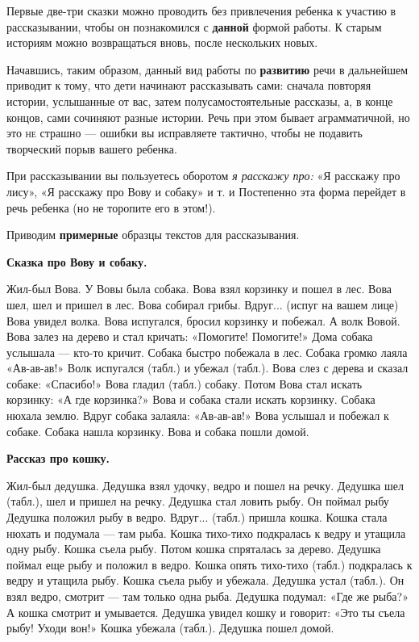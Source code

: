 \documentclass{book}
\renewcommand{\emph}[1]{\textit{#1}}
\begin{document}
Первые две-три сказки можно проводить без привлечения ребенка к участию
в рассказывании, чтобы он познакомился с \textbf{данной} формой работы.
К старым историям можно возвращаться вновь, после нескольких новых.

Начавшись, таким образом, данный вид работы по \textbf{развитию} речи в
дальнейшем приводит к тому, что дети начинают рассказывать сами: сначала
повторяя истории, услышанные от вас, затем полусамостоятельные рассказы,
а, в конце концов, сами сочиняют разные истории. Речь при этом бывает
аграмматичной, но это \textsc{не} страшно --- ошибки вы исправляете
тактично, чтобы не подавить творческий порыв вашего ребенка.

При рассказывании вы пользуетесь оборотом \emph{я расскажу про:} «Я
расскажу про лису», «Я расскажу про Вову и собаку» и т. и Постепенно эта
форма перейдет в речь ребенка (но не торопите его в этом!).

Приводим \textbf{примерные} образцы текстов для рассказывания.

\textbf{Сказка про Вову и собаку.}

Жил-был Вова. У Вовы была собака. Вова взял корзинку и пошел в лес. Вова
шел, шел и пришел в лес. Вова собирал грибы. Вдруг... (испуг на вашем
лице) Вова увидел волка. Вова испугался, бросил корзинку и побежал. А
волк Вовой. Вова залез на дерево и стал кричать: «Помогите! Помогите!»
Дома собака услышала --- кто-то кричит. Собака быстро побежала в лес.
Собака громко лаяла «Ав-ав-ав!» Волк испугался (табл.) и убежал (табл.).
Вова слез с дерева и сказал собаке: «Спасибо!» Вова гладил (табл.)
собаку. Потом Вова стал искать корзинку: «А где корзинка?» Вова и собака
стали искать корзинку. Собака нюхала землю. Вдруг собака залаяла:
«Ав-ав-ав!» Вова услышал и побежал к собаке. Собака нашла корзинку. Вова
и собака пошли домой.

\textbf{Рассказ про кошку.}

Жил-был дедушка. Дедушка взял удочку, ведро и пошел на речку. Дедушка
шел (табл.), шел и пришел на речку. Дедушка стал ловить рыбу. Он поймал
рыбу Дедушка положил рыбу в ведро. Вдруг... (табл.) пришла кошка. Кошка
стала нюхать и подумала --- там рыба. Кошка тихо-тихо подкралась к ведру
и утащила одну рыбу. Кошка съела рыбу. Потом кошка спряталась за дерево.
Дедушка поймал еще рыбу и положил в ведро. Кошка опять тихо-тихо (табл.)
подкралась к ведру и утащила рыбу. Кошка съела рыбу и убежала. Дедушка
устал (табл.). Он взял ведро, смотрит --- там только одна рыба. Дедушка
подумал: «Где же рыба?» А кошка смотрит и умывается. Дедушка увидел
кошку и говорит: «Это ты съела рыбу! Уходи вон!» Кошка убежала (табл.).
Дедушка пошел домой.
\end{document}
